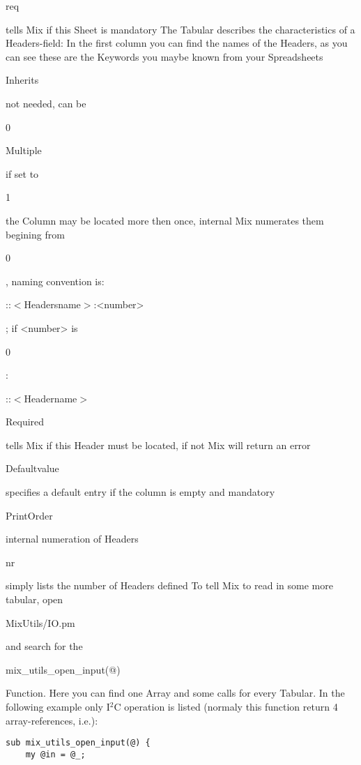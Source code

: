 \documentclass[a4paper,12pt]{article}
\begin{document}
\begin{tt}
  \begin{tt}req\end{tt} tells Mix if this Sheet is mandatory\newline
\newline
The Tabular describes the characteristics of a Headers-field:\newline
In the first column you can find the names of the Headers, as you can see these are the Keywords you maybe known from your Spreadsheets\newline
\begin{tt}Inherits\end{tt} not needed, can be \begin{tt}0\end{tt}\newline
\begin{tt}Multiple\end{tt} if set to \begin{tt}1\end{tt} the Column may be located more then once, internal Mix numerates them begining from \begin{tt}0\end{tt}, naming convention is: \begin{tt}::$<$Headersname$>$:<number>\end{tt}; if <number> is \begin{tt}0\end{tt}: \begin{tt}::$<$Headername$>$\end{tt}\newline
\begin{tt}Required\end{tt} tells Mix if this Header must be located, if not Mix will return an error\newline
\begin{tt}Defaultvalue\end{tt} specifies a default entry if the column is empty and mandatory\newline
\begin{tt}PrintOrder\end{tt} internal numeration of Headers\newline
\begin{tt}nr\end{tt} simply lists the number of Headers defined\newline
\newline
To tell Mix to read in some more tabular, open \begin{tt}MixUtils/IO.pm\end{tt} and search for the \begin{tt}mix\_utils\_open_input(@)\end{tt} Function. Here you can find one Array and some calls for every Tabular. In the following example only I$^2$C operation is listed (normaly this function return 4 array-references, i.e.):
\begin{verbatim}
sub mix_utils_open_input(@) {
    my @in = @_;


\end{verbatim}
\end{tt}
\end{document}
